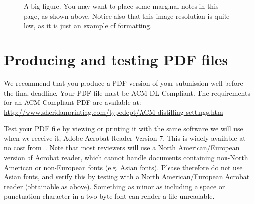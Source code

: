 \documentclass{sigchi-ext}
\begin{document}
\clearpage
{}
\begin{figure}
\hspace*{-0.5\textwidth}%
\parbox{\textwidth}{
  \begin{center}
  \caption{A big figure. You may want to place some marginal notes in this page, as shown above. Notice also that this image resolution is quite low, as it is just an example of formatting.}
  \label{fig:bigsample}
  \end{center}  
}
\end{figure}



\section{Producing and testing PDF files}
We recommend that you produce a PDF version of your submission well before the final deadline. 
Your PDF file must be ACM DL Compliant. 
The requirements for an ACM Compliant PDF are available at:
\url{http://www.sheridanprinting.com/typedept/ACM-distilling-settings.htm}

Test your PDF file by viewing or printing it with the same software we will use when we receive it, Adobe Acrobat Reader Version 7. 
This is widely available at no cost from~\cite{Acrobat7}.  
Note that most reviewers will use a North American/European version of Acrobat reader, which cannot handle documents containing non-North American or non-European fonts (e.g. Asian fonts).  
Please therefore do not use Asian fonts, and verify this by testing with a North American/European Acrobat reader (obtainable as above). Something as minor as including a space or punctuation character in a two-byte font can render a file unreadable.
\end{document}
